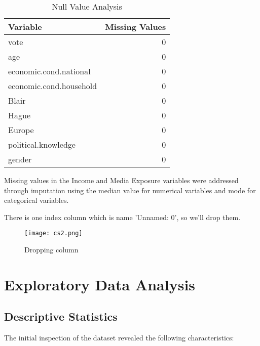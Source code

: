 \documentclass[12pt]{article}
\begin{document}
\begin{table}[H]
\centering
\caption{Null Value Analysis}
\label{fig:null_analysis}
\begin{tabular}{lr}
\toprule
\textbf{Variable} & \textbf{Missing Values} \\
\midrule
vote                      & 0\\
age                       & 0\\
economic.cond.national    & 0\\
economic.cond.household   & 0\\
Blair                     & 0\\
Hague                     & 0\\
Europe                    & 0\\
political.knowledge       & 0\\
gender                    & 0\\
\bottomrule
\end{tabular}
\end{table}

Missing values in the Income and Media Exposure variables were addressed through imputation using the median value for numerical variables and mode for categorical variables.

There is one index column which is name 'Unnamed: 0', so we'll drop them.

\begin{figure}[h]
    \centering
    \texttt{[image: cs2.png]}
    \caption{Dropping column}
    \label{fig:example}
\end{figure}



\section{Exploratory Data Analysis}

\subsection{Descriptive Statistics}
The initial inspection of the dataset revealed the following characteristics:
\end{document}
